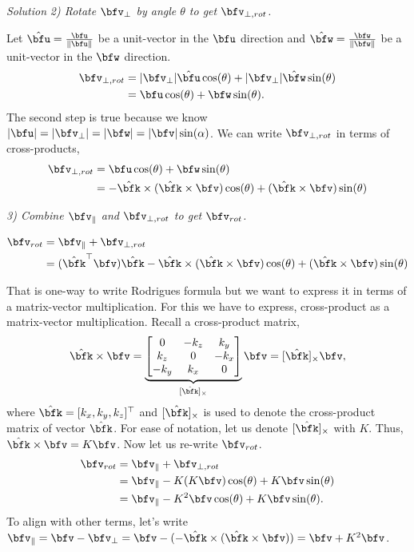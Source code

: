 \documentclass{article}
\numberwithin{prob}{section}
\newenvironment{solution}{\emph{Solution}}{}
\begin{document}
\begin{solution}
\emph{2) Rotate $\bfv_\perp$ by angle $\theta$ to get $\bfv_{\perp,rot}$.}

Let $\hat{\bfu} = \frac{\bfu}{\|\bfu\|}$ be a unit-vector in the $\bfu$ direction and $\hat{\bfw} = \frac{\bfw}{\|\bfw\|}$ be a unit-vector in the $\bfw$ direction.
\begin{align}
  \bfv_{\perp,rot} &= |\bfv_\perp|\hat{\bfu} \cos(\theta) + |\bfv_\perp|\hat{\bfw} \sin(\theta)\\
                   &=\bfu \cos(\theta) + \bfw \sin(\theta).
\end{align}
The second step is true  because we know $|\bfu| = |\bfv_\perp| = |\bfw| = |\bfv| \sin(\alpha)$.
We can write $\bfv_{\perp,rot}$ in terms of cross-products,
\begin{align}
  \bfv_{\perp,rot} &=\bfu \cos(\theta) + \bfw \sin(\theta)\\
                   &= - \hat{\bfk} \times (\hat{\bfk} \times \bfv) \cos(\theta) + (\hat{\bfk} \times \bfv)\sin(\theta)
\end{align}

\emph{3) Combine $\bfv_\parallel$ and $\bfv_{\perp,rot}$ to get $\bfv_{rot}$. }

\begin{align}
  \bfv_{rot} &= \bfv_\parallel + \bfv_{\perp,rot} \\
             &= (\hat{\bfk}^\top  \bfv) \hat{\bfk} 
- \hat{\bfk} \times (\hat{\bfk} \times \bfv) \cos(\theta) + (\hat{\bfk} \times \bfv)\sin(\theta)
\end{align}

That is one-way to write Rodrigues formula but we want to express it in terms of a matrix-vector multiplication. For this we have to express, cross-product as a matrix-vector multiplication. Recall a cross-product matrix,
\begin{align}
  \hat{\bfk} \times \bfv = \underbrace{\begin{bmatrix}
    0 & -k_z & k_y\\
    k_z & 0 & -k_x\\
    -k_y & k_x & 0
\end{bmatrix}}_{[\hat{\bfk}]_\times}\bfv = [\hat{\bfk}]_\times\bfv,
\end{align}
where $\hat{\bfk} = [k_x, k_y, k_z]^\top$ and $[\hat{\bfk}]_\times$ is used to denote the cross-product matrix of vector $\hat{\bfk}$. For ease of notation, let us denote $[\hat{\bfk}]_\times$ with $K$. Thus, $\hat{\bfk} \times \bfv = K\bfv$. Now let us re-write $\bfv_{rot}$.
\begin{align}
  \bfv_{rot} &= \bfv_\parallel + \bfv_{\perp,rot} \\
             &= \bfv_\parallel - K (K \bfv) \cos(\theta) + K \bfv \sin(\theta)\\
             &= \bfv_\parallel - K^2 \bfv \cos(\theta) + K \bfv \sin(\theta).
\end{align}
To align with other terms, let's write $\bfv_\parallel = \bfv - \bfv_\perp = \bfv - (- \hat{\bfk} \times (\hat{\bfk} \times \bfv)) = \bfv + K^2 \bfv$.


\end{solution}
\end{document}
